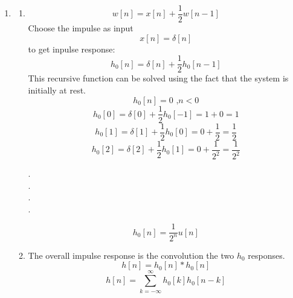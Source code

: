 \documentclass[10pt,a4paper, margin=1in]{article}
\begin{document}
\begin{enumerate}
\begin{enumerate}
\end{enumerate}     
    
\item %
    \begin{enumerate}
    \item %
    \begin{equation*}
         w[n] = x[n] + \frac{1}{2}w[n-1]
    \end{equation*}
    Choose the impulse as input 
    \begin{equation*}
        x[n] = \delta[n]   
    \end{equation*}    
    to get inpulse response:
    \begin{equation*}
        h_{0}[n] = \delta[n] +   \frac{1}{2}h_0[n-1]
    \end{equation*}
    This recursive function can be solved using the fact that the system is initially at rest.
    \begin{equation*}
        h_0[n] = 0 \text{   ,}n < 0
    \end{equation*}
    \begin{equation*}
        h_0[0] = \delta[0]  +   \frac{1}{2}h_0[-1] = 1 + 0 = 1
    \end{equation*}
    \begin{equation*}
        h_0[1] = \delta[1]  +   \frac{1}{2}h_0[0] = 0 + \frac{1}{2} = \frac{1}{2}
    \end{equation*}
    \begin{equation*}
        h_0[2] = \delta[2]  +   \frac{1}{2}h_0[1] = 0 + \frac{1}{2^2} = \frac{1}{2^2}
    \end{equation*}
\begin{center}
    .\\.\\.\\.
\end{center}
\begin{equation}
    h_0[n] = \frac{1}{2^n} u[n]
\end{equation}
    \item %
The overall impulse response is the convolution the two $h_0$ responses.
\begin{equation*}
    h[n] = h_0[n] * h_0[n]
\end{equation*}
\begin{equation*}
    h[n]  = \sum\limits_{k=-\infty}^{\infty} h_0[k]h_0[n-k]
\end{equation*}

\end{enumerate}
\end{enumerate}
\end{document}
